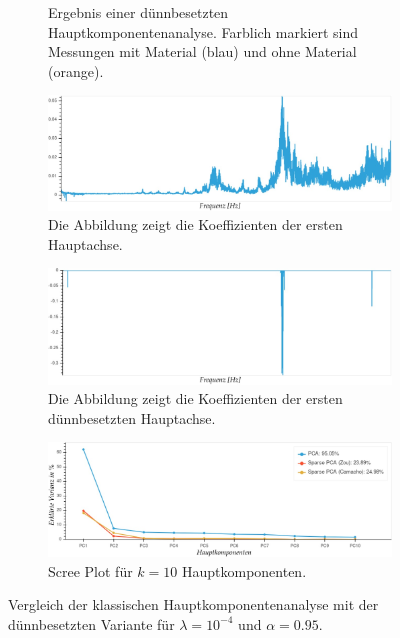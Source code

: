 \begin{figure}
\begin{subfigure}{0.45\textwidth}
\caption{Ergebnis einer dünnbesetzten Hauptkomponentenanalyse. Farblich markiert sind Messungen mit Material (blau) und ohne Material (orange).}
\label{sparse_pca_classical_analysis_sparse_pc_graph}
\end{subfigure}
\vspace{0.25cm}
%
\begin{subfigure}{0.9\textwidth}
\centering
\includegraphics[width=\textwidth]{figures/Signal_5_principal_axis.jpg}
\caption{Die Abbildung zeigt die Koeffizienten der ersten Hauptachse.}
\label{sparse_pca_classical_analysis_principal_axis}
\end{subfigure}
\vspace{0.25cm}
%
\begin{subfigure}{0.9\textwidth}
\centering
\includegraphics[width=\textwidth]{figures/Signal_5_sparse_principal_axis.jpg}
\caption{Die Abbildung zeigt die Koeffizienten der ersten dünnbesetzten Hauptachse.}
\label{sparse_pca_classical_analysis_sparse_principal_axis}
\end{subfigure}
%
\begin{subfigure}{0.9\textwidth}
\centering
\includegraphics[width = \textwidth]{figures/Signal_5_scree_plot_10.jpg}
\caption{Scree Plot für $k=10$ Hauptkomponenten.}
\label{sparse_pca_classical_analysis_scree_plot}
\end{subfigure}
\caption{Vergleich der klassischen Hauptkomponentenanalyse mit der dünnbesetzten Variante für $\lambda=10^{-4}$ und $\alpha = 0.95$.}
\label{sparse_pca_classical_analysis}
\end{figure}


